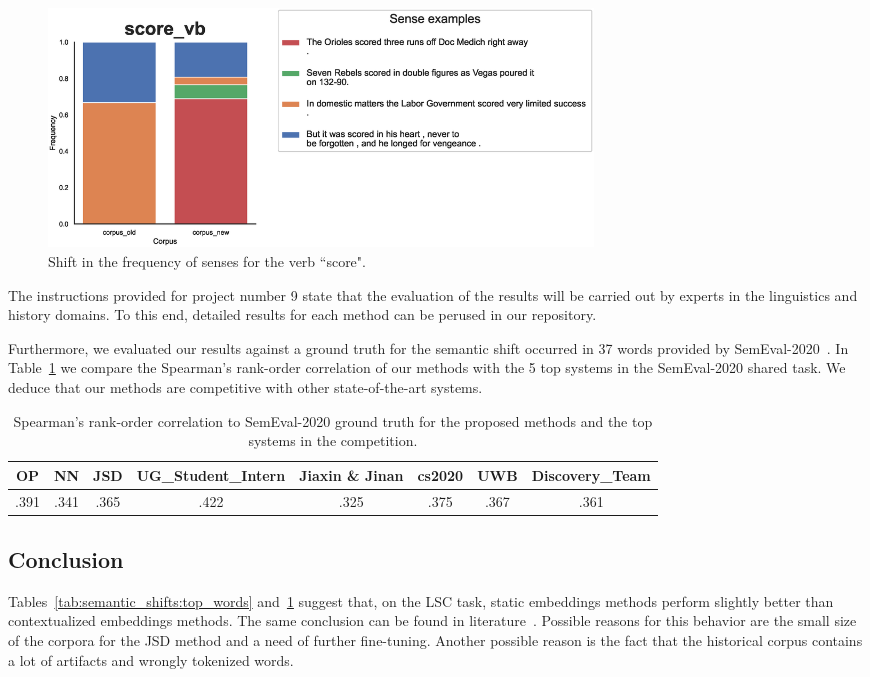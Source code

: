 \documentclass[runningheads]{llncs}
\begin{document}
\begin{figure}
    \center
    \includegraphics[width=0.7\textwidth]{img/33_score_vb.eps}
    \caption{Shift in the frequency of senses for the verb “score".} 
    \label{fig:semantic_shifts:score}
\end{figure}

The instructions provided for project number 9 state that the evaluation of the results will be carried out by experts in the linguistics and history domains. To this end, detailed results for each method can be perused in our repository.

Furthermore, we evaluated our results against a ground truth for the semantic shift occurred in 37 words provided by SemEval-2020~\cite{schlechtweg-etal-2020-semeval}. In Table~\ref{tab:semantic_shifts:spearman} we compare the Spearman's rank-order correlation of our methods with the 5 top systems in the SemEval-2020 shared task. We deduce that our methods are competitive with other state-of-the-art systems.

\begin{table}
    \caption{Spearman's rank-order correlation to SemEval-2020 ground truth for the proposed methods and the top systems in the competition.}
    \label{tab:semantic_shifts:spearman}
    \centering
    \begin{tabular}{|c|c|c|c|c|c|c|c|}
        \toprule
        OP & NN & JSD & UG\_Student\_Intern & Jiaxin \& Jinan & cs2020 & UWB & Discovery\_Team \\
        \midrule
        .391 & .341 & .365 & .422 & .325 & .375 & .367 & .361 \\
        \bottomrule
    \end{tabular}
\end{table}

\subsection{Conclusion}
\label{subsec:semantic_shifts:conclusion}

Tables~\ref{tab:semantic_shifts:top_words} and~\ref{tab:semantic_shifts:spearman} suggest that, on the LSC task, static embeddings methods perform slightly better than contextualized embeddings methods. The same conclusion can be found in literature~\cite{laicher-etal-2021-explaining,schlechtweg-etal-2020-semeval}. Possible reasons for this behavior are the small size of the corpora for the JSD method and a need of further fine-tuning. Another possible reason is the fact that the historical corpus contains a lot of artifacts and wrongly tokenized words.
\end{document}
